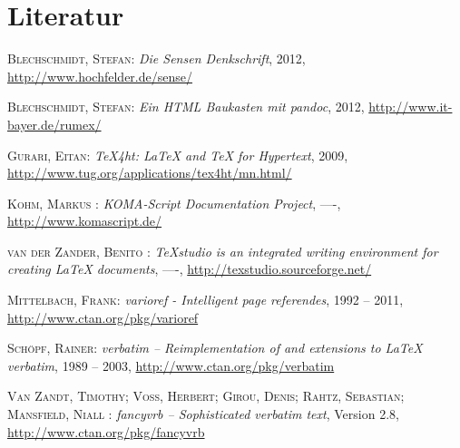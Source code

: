 \chapter{Literatur}

\begin{flushleft}
\begin{thebibliography}{999}

\if\htorlx
\else
\fi

\textsc{Blechschmidt, Stefan}: 
\emph{Die Sensen Denkschrift}, 
2012, 
\url{http://www.hochfelder.de/sense/}


\textsc{Blechschmidt, Stefan}:
\emph{Ein HTML Baukasten mit pandoc},
2012,
\url{http://www.it-bayer.de/rumex/}


\textsc{Gurari, Eitan}:
\emph{TeX4ht: LaTeX and TeX for Hypertext},
2009,
\url{http://www.tug.org/applications/tex4ht/mn.html/}


\textsc{Kohm, Markus }:
\emph{KOMA-Script Documentation Project},
----,
\url{http://www.komascript.de/}


\textsc{van der Zander, Benito }:
\emph{TeXstudio is an integrated writing environment for creating LaTeX documents},
----,
\url{http://texstudio.sourceforge.net/}


\textsc{Mittelbach, Frank}:
\emph{varioref - Intelligent page referendes},
1992 -- 2011,
\url{http://www.ctan.org/pkg/varioref}


\textsc{Schöpf, Rainer}:
\emph{verbatim – Reimplementation of and extensions to \LaTeX{} verbatim},
1989 -- 2003,
\url{http://www.ctan.org/pkg/verbatim}


\textsc{Van Zandt, Timothy;
Voß, Herbert;
Girou, Denis;
Rahtz, Sebastian;
Mansfield, Niall
}:
\emph{fancyvrb – Sophisticated verbatim text},
Version 2.8,
\url{http://www.ctan.org/pkg/fancyvrb}



\end{thebibliography}
\end{flushleft}
